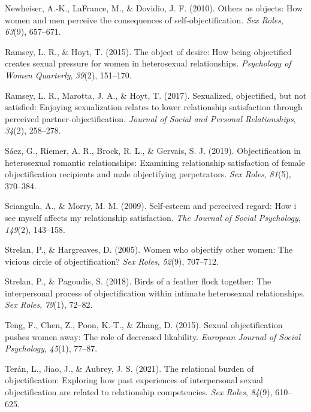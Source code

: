 \documentclass[
  english,
  man]{apa6}
\newlength{\cslhangindent}
\newlength{\cslentryspacingunit} %
\newenvironment{CSLReferences}[2] %
 {%
  \setlength{\parindent}{0pt}
  \ifodd #1
  \let\oldpar\par
  \def\par{\hangindent=\cslhangindent\oldpar}
  \fi
  \setlength{\parskip}{#2\cslentryspacingunit}
 }%
 {}
\begin{document}
\begin{CSLReferences}{1}{0}
\leavevmode{}%
Newheiser, A.-K., LaFrance, M., \& Dovidio, J. F. (2010). Others as objects: How women and men perceive the consequences of self-objectification. \emph{Sex Roles}, \emph{63}(9), 657--671.

\leavevmode{}%
Ramsey, L. R., \& Hoyt, T. (2015). The object of desire: How being objectified creates sexual pressure for women in heterosexual relationships. \emph{Psychology of Women Quarterly}, \emph{39}(2), 151--170.

\leavevmode{}%
Ramsey, L. R., Marotta, J. A., \& Hoyt, T. (2017). Sexualized, objectified, but not satisfied: Enjoying sexualization relates to lower relationship satisfaction through perceived partner-objectification. \emph{Journal of Social and Personal Relationships}, \emph{34}(2), 258--278.

\leavevmode{}%
Sáez, G., Riemer, A. R., Brock, R. L., \& Gervais, S. J. (2019). Objectification in heterosexual romantic relationships: Examining relationship satisfaction of female objectification recipients and male objectifying perpetrators. \emph{Sex Roles}, \emph{81}(5), 370--384.

\leavevmode{}%
Sciangula, A., \& Morry, M. M. (2009). Self-esteem and perceived regard: How i see myself affects my relationship satisfaction. \emph{The Journal of Social Psychology}, \emph{149}(2), 143--158.

\leavevmode{}%
Strelan, P., \& Hargreaves, D. (2005). Women who objectify other women: The vicious circle of objectification? \emph{Sex Roles}, \emph{52}(9), 707--712.

\leavevmode{}%
Strelan, P., \& Pagoudis, S. (2018). Birds of a feather flock together: The interpersonal process of objectification within intimate heterosexual relationships. \emph{Sex Roles}, \emph{79}(1), 72--82.

\leavevmode{}%
Teng, F., Chen, Z., Poon, K.-T., \& Zhang, D. (2015). Sexual objectification pushes women away: The role of decreased likability. \emph{European Journal of Social Psychology}, \emph{45}(1), 77--87.

\leavevmode{}%
Terán, L., Jiao, J., \& Aubrey, J. S. (2021). The relational burden of objectification: Exploring how past experiences of interpersonal sexual objectification are related to relationship competencies. \emph{Sex Roles}, \emph{84}(9), 610--625.


\end{CSLReferences}
\end{document}
